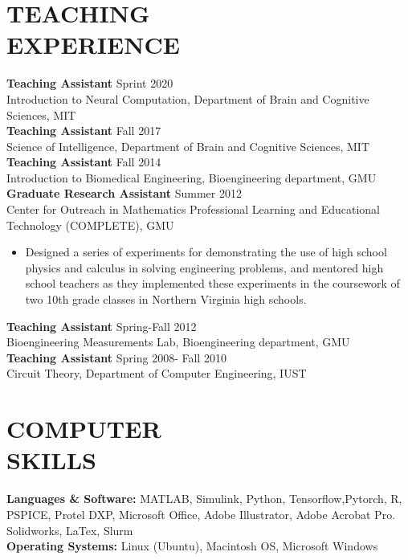 \documentclass[margin, 10pt]{res}
\begin{document}
\begin{resume}
\section { TEACHING  \\ EXPERIENCE} 
\textbf{Teaching Assistant}  \hfill Sprint 2020\\
Introduction to Neural Computation, Department of Brain and Cognitive Sciences, MIT \
\vspace{2.5mm} \\
\textbf{Teaching Assistant}  \hfill Fall 2017\\
Science of Intelligence, Department of Brain and Cognitive Sciences, MIT \
\vspace{2.5mm} \\
\textbf{Teaching Assistant}   \hfill Fall 2014\\
Introduction to Biomedical Engineering, Bioengineering department, GMU \
\vspace{2.5mm} \\
\textbf{Graduate Research Assistant}  \hfill Summer 2012\\ 
Center for Outreach in Mathematics Professional Learning and Educational \\
Technology (COMPLETE), GMU
\vspace{2mm} \
\begin{itemize} \itemsep -2pt %
\item  Designed a series of experiments for demonstrating the use of high school physics and calculus in solving engineering problems, and mentored high school teachers as
they implemented these experiments in the coursework of two 10th grade classes in Northern Virginia high schools. 
\end{itemize}
\textbf{Teaching Assistant}   \hfill Spring-Fall 2012\\
Bioengineering Measurements Lab, Bioengineering department, GMU \
\vspace{2.5mm} \\
\textbf{Teaching Assistant}  \hfill Spring 2008- Fall 2010\\ 
Circuit Theory, Department of Computer Engineering, IUST   
\section{COMPUTER \\ SKILLS}
\textbf{Languages \& Software: } MATLAB, Simulink, Python, Tensorflow,Pytorch, R, PSPICE, Protel DXP, Microsoft
Office, Adobe Illustrator, Adobe Acrobat Pro. Solidworks, LaTex, Slurm
\vspace{2.5mm} \\
\textbf{Operating Systems: } Linux (Ubuntu), Macintosh OS, Microsoft Windows

\end{resume}
\end{document}
